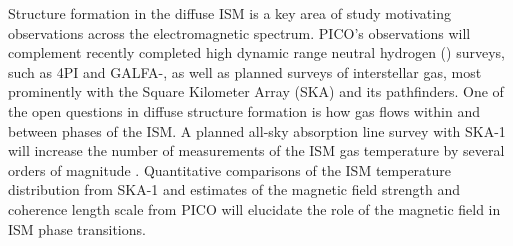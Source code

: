 \documentclass[PICOReport.tex]{subfiles}
\begin{document}
Structure formation in the diffuse ISM is a key area of study motivating observations across the electromagnetic spectrum. PICO's observations will complement recently completed high dynamic range neutral hydrogen (\HI) surveys, such as \HI4PI \citep{HI4PI:2016} and GALFA-\hi \citep{Peek:2018}, as well as planned surveys of interstellar gas, most prominently with the Square Kilometer Array (SKA) and its pathfinders. One of the open questions in diffuse structure formation is how gas flows within and between phases of the ISM. A planned all-sky absorption line survey with SKA-1 will increase the number of measurements of the ISM gas temperature by several orders of magnitude \citep{McClure-Griffiths2015}. Quantitative comparisons of the ISM temperature distribution from SKA-1 and estimates of the magnetic field strength and coherence length scale from PICO will elucidate the role of the magnetic field in ISM phase transitions.
\end{document}
